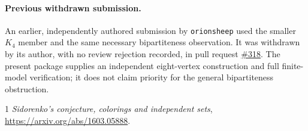 \documentclass[10pt]{article}
\begin{document}
\paragraph{Previous withdrawn submission.}
An earlier, independently authored submission by \texttt{orionsheep}
used the smaller $K_4$ member and the same necessary bipartiteness
observation. It was withdrawn by its author, with no review rejection
recorded, in pull request
\href{https://github.com/The-Last-Math-Competition/The-Last-Math-Competition/pull/318}{\#318}.
The present package supplies an independent eight-vertex construction
and full finite-model verification; it does not claim priority for the
general bipartiteness obstruction.

\begin{thebibliography}{1}
\emph{Sidorenko's conjecture, colorings and independent sets},
\url{https://arxiv.org/abs/1603.05888}.
\end{thebibliography}
\end{document}
